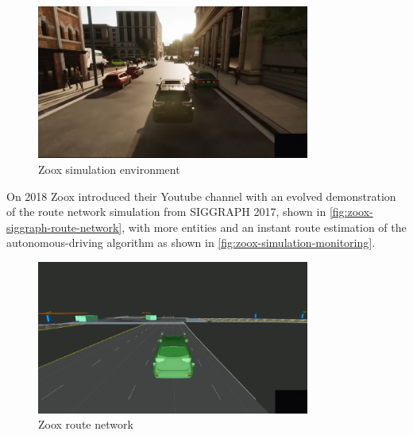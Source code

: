     \begin{figure}[H]
     \caption{\label{fig:zoox-simulation-basic-model}
Zoox simulation environment}
     \begin{center}
        \includegraphics[width=0.8\textwidth]{images/zoox-simulation-basic-model.png}
     \end{center}
    \end{figure}

    On 2018 Zoox introduced their Youtube channel \cite{zoox-youtube-channel} with an evolved demonstration of the route network simulation from SIGGRAPH 2017, shown in \autoref{fig:zoox-siggraph-route-network}, with more entities and an instant route estimation of the autonomous-driving algorithm \cite{zoox-fully-autonomous-driving} as shown in \autoref{fig:zoox-simulation-monitoring}.
    
    \begin{figure}[H]
     \caption{\label{fig:zoox-siggraph-route-network}
Zoox route network}
     \begin{center}
        \includegraphics[width=0.8\textwidth]{images/zoox-siggraph-route-network.png}
     \end{center}
    \end{figure}
    
